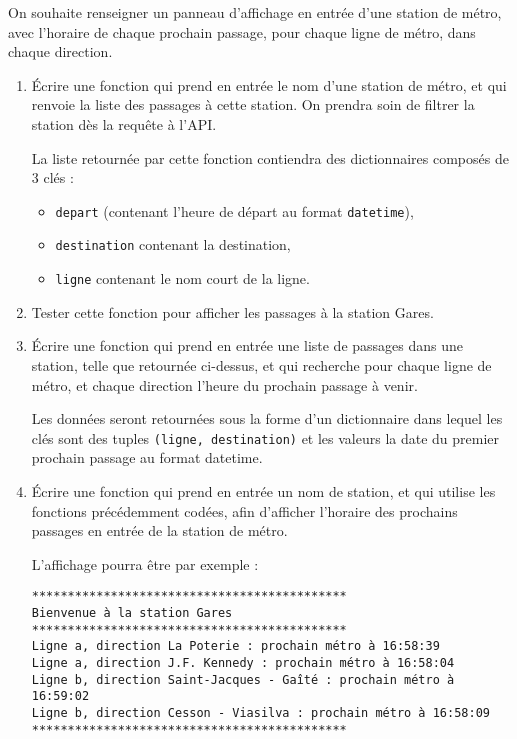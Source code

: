 \documentclass[11pt,a4paper]{article}
\begin{document}
On souhaite renseigner un panneau d'affichage en entrée d'une station de métro, avec l'horaire de chaque prochain passage, pour chaque ligne de métro, dans chaque direction. 

\begin{enumerate}
    \item Écrire une fonction qui prend en entrée le nom d'une station de métro, et qui renvoie la liste des passages à cette station. On prendra soin de filtrer la station dès la requête à l'API.

    La liste retournée par cette fonction contiendra des dictionnaires composés de 3 clés : 
    \begin{itemize}
        \item \verb+depart+ (contenant l'heure de départ au format \verb+datetime+), 
        \item \verb+destination+ contenant la destination,
       \item \verb+ligne+ contenant le nom court de la ligne.
    \end{itemize}
    \item Tester cette fonction pour afficher les passages à la station Gares.
    \item Écrire une fonction qui prend en entrée une liste de passages dans une station, telle que retournée ci-dessus, et qui recherche pour chaque ligne de métro, et chaque direction l'heure du prochain passage à venir. 
    
    Les données seront retournées sous la forme d'un dictionnaire dans lequel les clés sont des tuples \verb+(ligne, destination)+ et les valeurs la date du premier prochain passage au format datetime. 

    \item Écrire une fonction qui prend en entrée un nom de station, et qui utilise les fonctions précédemment codées, afin d'afficher l'horaire des prochains passages en entrée de la station de métro. 
    
    L'affichage pourra être par exemple : 
    \begin{verbatim}
********************************************
Bienvenue à la station Gares
********************************************
Ligne a, direction La Poterie : prochain métro à 16:58:39
Ligne a, direction J.F. Kennedy : prochain métro à 16:58:04
Ligne b, direction Saint-Jacques - Gaîté : prochain métro à 16:59:02
Ligne b, direction Cesson - Viasilva : prochain métro à 16:58:09
********************************************
\end{verbatim}
\end{enumerate}
\end{document}
